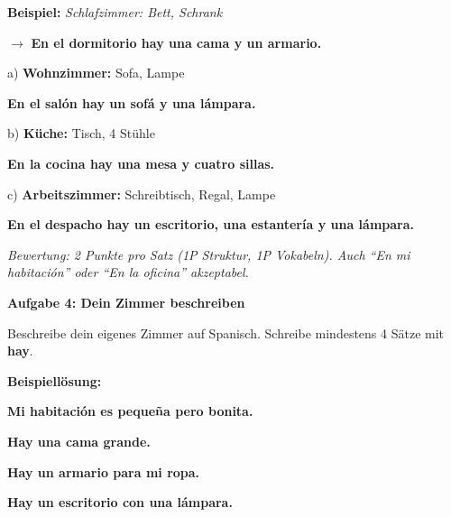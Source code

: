 \documentclass[11pt, a4paper]{article}
\newcommand{\fachfarbe}{spanisch}
\newcommand{\punktebox}[1]{\hfill\fbox{\small \_/#1}}
\newcommand{\loesung}[1]{\textcolor{loesung}{\textbf{#1}}}
\newenvironment{aufgabe}[1]{%
    \needspace{5\baselineskip}%
    \nopagebreak[4]%
    \vspace{10pt}
    \noindent\textbf{\textcolor{\fachfarbe}{Aufgabe #1}}
    \nopagebreak[4]%
    \vspace{5pt}
    \nopagebreak[4]%
    \begin{list}{}{\leftmargin=0pt}
    \item[]
}{%
    \end{list}
}
\newcommand{\es}[1]{\textcolor{\fachfarbe}{\textbf{#1}}}
\begin{document}
\noindent
\textbf{Beispiel:} \textit{Schlafzimmer: Bett, Schrank}

$\rightarrow$ \es{En el dormitorio hay una cama y un armario.}

\vspace{1em}

\noindent
a) \textbf{Wohnzimmer:} Sofa, Lampe

\vspace{0.3em}
\noindent
\loesung{En el salón hay un sofá y una lámpara.}

\vspace{1em}

\noindent
b) \textbf{Küche:} Tisch, 4 Stühle

\vspace{0.3em}
\noindent
\loesung{En la cocina hay una mesa y cuatro sillas.}

\vspace{1em}

\noindent
c) \textbf{Arbeitszimmer:} Schreibtisch, Regal, Lampe

\vspace{0.3em}
\noindent
\loesung{En el despacho hay un escritorio, una estantería y una lámpara.}

\vspace{0.5em}
\textit{\textcolor{grau}{Bewertung: 2 Punkte pro Satz (1P Struktur, 1P Vokabeln). Auch ``En mi habitación'' oder ``En la oficina'' akzeptabel.}}

\vspace{15pt}


\begin{aufgabe}{4: Dein Zimmer beschreiben}
Beschreibe dein eigenes Zimmer auf Spanisch. Schreibe mindestens 4 Sätze mit \es{hay}. \punktebox{6}
\end{aufgabe}

\textbf{Beispiellösung:}

\vspace{0.5em}

\loesung{Mi habitación es pequeña pero bonita.}

\loesung{Hay una cama grande.}

\loesung{Hay un armario para mi ropa.}

\loesung{Hay un escritorio con una lámpara.}
\end{document}
